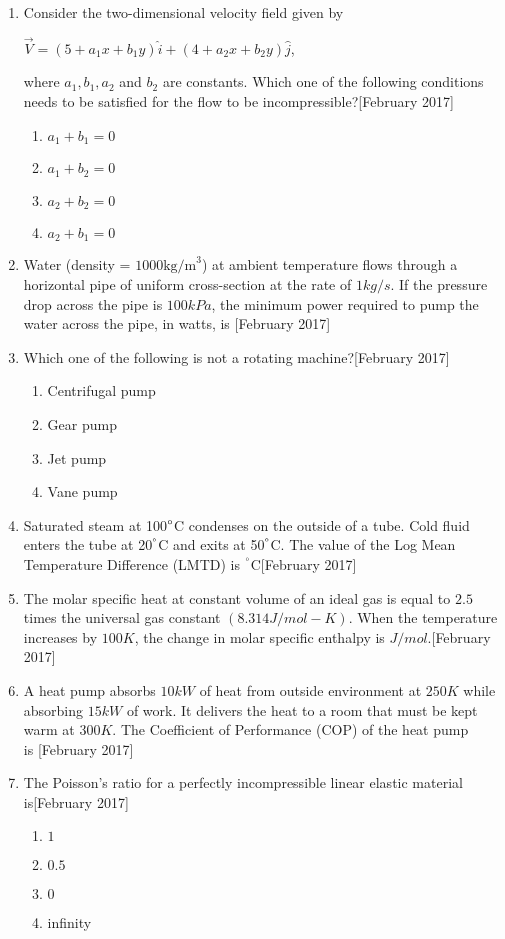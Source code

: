 \documentclass[journal]{IEEEtran}
\begin{document}
\begin{enumerate}
\item Consider the two-dimensional velocity field given by 
\begin{center}
$\vec{V} = (5 + a_1 x + b_1 y) \hat{i} + (4 + a_2 x + b_2 y) \hat{j}$,
\end{center}where $ a_1, b_1, a_2 $ and  $b_2$ are constants. Which one of the following conditions needs to be satisfied for the flow to be incompressible?\hfill[February 2017]
\begin{enumerate}
    \item $a_1 + b_1 = 0$
    \item $a_1 + b_2 = 0$
    \item $a_2 + b_2 = 0$
    \item $a_2 + b_1 = 0$
\end{enumerate}
\item Water (density = $1000\text{kg/m}^3$) at ambient temperature flows through a horizontal pipe of uniform cross-section at the rate of $1 kg/s$. If the pressure drop across the pipe is $100 kPa$, the minimum power required to pump the water across the pipe, in watts, is\underline{\hspace{2cm}} \hfill[February 2017]
\item Which one of the following is not a rotating machine?\hfill[February 2017]
\begin{enumerate}
    \item Centrifugal pump
    \item Gear pump
    \item Jet pump
    \item Vane pump
\end{enumerate}
\item Saturated steam at 100$\degree$C condenses on the outside of a tube. Cold fluid enters the tube at 20$^\degree$C and exits at 50$^\degree$C. The value of the Log Mean Temperature Difference (LMTD) is\underline{\hspace{2cm}} $^\degree$C\hfill[February 2017]
\item The molar specific heat at constant volume of an ideal gas is equal to $2.5$ times the universal gas constant $(8.314 J/mol-K)$. When the temperature increases by $100 K$, the change in molar specific enthalpy is \underline{\hspace{2cm}} $J/mol$.\hfill[February 2017]
\item A heat pump absorbs $10 kW$ of heat from outside environment at $250 K$ while absorbing $15 kW$ of work. It delivers the heat to a room that must be kept warm at $300 K$. The Coefficient of Performance (COP)  of the heat pump \\is \underline{\hspace{2cm}}\hfill[February 2017]
\item The Poisson's ratio for a perfectly incompressible linear elastic material \\is\hfill[February 2017]
\begin{enumerate}
    \item $1$
    \item $0.5$
    \item $0$
    \item infinity
\end{enumerate}
\end{enumerate}
\end{document}

